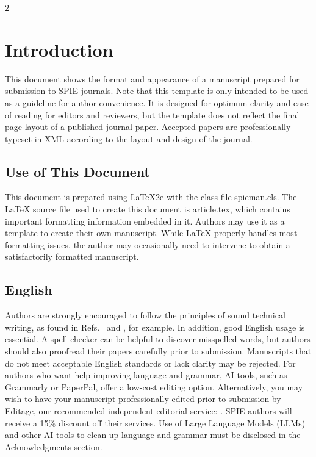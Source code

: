 \documentclass[12pt]{spieman}  %
\begin{document}
\begin{spacing}{2}   %

\section{Introduction}
\label{sect:intro}  %
This document shows the format and appearance of a manuscript prepared for submission to SPIE journals. Note that this template is only intended to be used as a guideline for author convenience. It is designed for optimum clarity and ease of reading for editors and reviewers, but the template does not reflect the final page layout of a published journal paper. Accepted papers are professionally typeset in XML according to the layout and design of the journal. 

\subsection{Use of This Document}

This document is prepared using LaTeX2e\cite{Lamport94,Goossens97} with the class file {\ttfamily spieman.cls}.  The LaTeX source file used to create this document is {\ttfamily article.tex}, which contains important formatting information embedded in it. Authors may use it as a template to create their own manuscript. While LaTeX properly handles most formatting issues, the author may occasionally need to intervene to obtain a satisfactorily  formatted manuscript.

\subsection{English}

Authors are strongly encouraged to follow the principles of sound technical writing, as found in Refs.~ and , for example. In addition, good English usage is essential. A spell-checker can be helpful to discover misspelled words, but authors should also proofread their papers carefully prior to submission. Manuscripts that do not meet acceptable English standards or lack clarity may be rejected. For authors who want help improving language and grammar, AI tools, such as Grammarly or PaperPal, offer a low-cost editing option. Alternatively, you may wish to have your manuscript professionally edited prior to submission by Editage, our recommended independent editorial service: . SPIE authors will receive a 15\% discount off their services. Use of Large Language Models (LLMs) and other AI tools to clean up language and grammar must be disclosed in the Acknowledgments section. 


\end{spacing}
\end{document}
